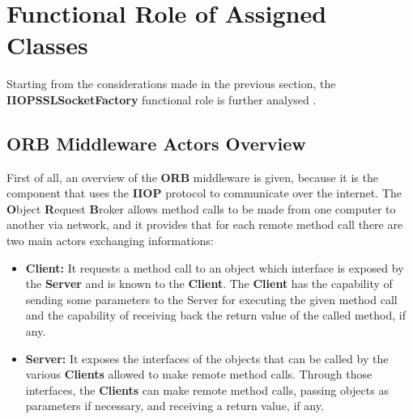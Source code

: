 \section{Functional Role of Assigned Classes}
Starting from the considerations made in the previous section, the \textbf{IIOPSSLSocketFactory} functional role is further analysed .

\subsection{ORB Middleware Actors Overview}
First of all, an overview of the \textbf{ORB} middleware is given, because it is the component that uses the \textbf{IIOP} protocol to communicate over the internet.
The \textbf{O}bject \textbf{R}equest \textbf{B}roker allows method calls to be made from one computer to another via network, and it provides that for each remote method call there are two main actors exchanging informations:
\begin{itemize}
	\item \textbf{Client:}
		It requests a method call to an object which interface is exposed by the \textbf{Server} and is known to the \textbf{Client}.
		The \textbf{Client} has the capability of sending some parameters to the Server for executing the given method call and the capability of receiving back the return value of the called method, if any.
	\item \textbf{Server:}
		It exposes the interfaces of the objects that can be called by the various \textbf{Clients} allowed to make remote method calls.
		Through those interfaces, the \textbf{Clients} can make remote method calls, passing objects as parameters if necessary, and receiving a return value, if any.
\end{itemize}

